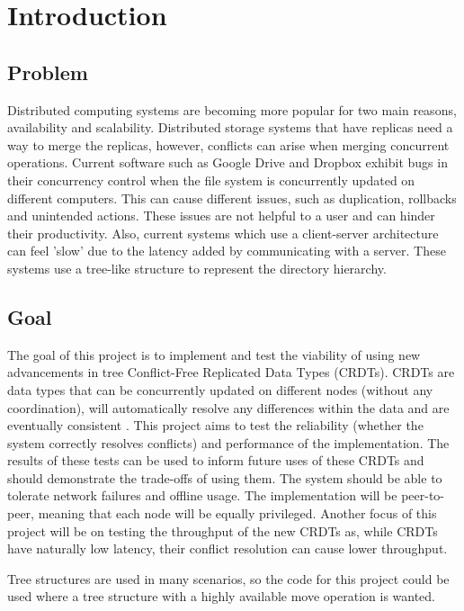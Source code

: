 \documentclass[12pt]{article}
\begin{document}
\newpage
\tableofcontents

\newpage
\section{Introduction}

\subsection{Problem}
Distributed computing systems are becoming more popular for two main reasons, availability and scalability. Distributed storage systems that have replicas need a way to merge the replicas, however, conflicts can arise when merging concurrent operations. Current software such as Google Drive and Dropbox exhibit bugs in their concurrency control when the file system is concurrently updated on different computers. This can cause different issues, such as duplication, rollbacks and unintended actions. These issues are not helpful to a user and can hinder their productivity. Also, current systems which use a client-server architecture can feel 'slow' due to the latency added by communicating with a server. These systems use a tree-like structure to represent the directory hierarchy.

\subsection{Goal}
The goal of this project is to implement and test the viability of using new advancements in tree Conflict-Free Replicated Data Types (CRDTs). CRDTs are data types that can be concurrently updated on different nodes (without any coordination), will automatically resolve any differences within the data and are eventually consistent \cite{10.1007/978-3-642-24550-3_29}.  This project aims to test the reliability (whether the system correctly resolves conflicts) and performance of the implementation. The results of these tests can be used to inform future uses of these CRDTs and should demonstrate the trade-offs of using them. The system should be able to tolerate network failures and offline usage. The implementation will be peer-to-peer, meaning that each node will be equally privileged. Another focus of this project will be on testing the throughput of the new CRDTs as, while CRDTs have naturally low latency, their conflict resolution can cause lower throughput. \par
Tree structures are used in many scenarios, so the code for this project could be used where a tree structure with a highly available move operation is wanted.
\end{document}
